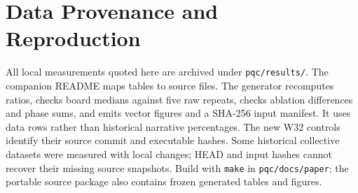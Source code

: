 \documentclass[conference,letterpaper]{IEEEtran}
\newcommand{\code}[1]{\texttt{#1}}
\begin{document}
\appendices
\section{Data Provenance and Reproduction}
All local measurements quoted here are archived under \code{pqc/results/}.
The companion README maps tables to source files. The generator recomputes
ratios, checks board medians against five raw repeats, checks ablation
differences and phase sums, and emits vector figures
and a SHA-256 input manifest. It uses data rows rather than historical
narrative percentages. The new W32 controls identify their source commit and
executable hashes. Some historical collective datasets were measured with
local changes; HEAD and input hashes cannot recover their missing source
snapshots. Build with \code{make} in
\code{pqc/docs/paper}; the portable source package also contains
frozen generated tables and figures.

\balance


\end{document}
